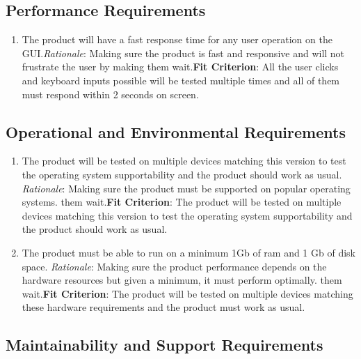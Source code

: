\documentclass[12pt, titlepage]{article}
\begin{document}
\subsection{Performance Requirements}
\begin{enumerate}[{NFR}3.]
	\item The product will have a fast response time for any user operation on the GUI.\newline \emph{Rationale}:  Making sure the product is fast and responsive and will not frustrate the user by making them wait.\newline \textbf{Fit Criterion}: All the user clicks and keyboard inputs possible will be tested multiple times and all of them must respond within 2 seconds on screen. 
\end{enumerate}

\subsection{Operational and Environmental Requirements}

\begin{enumerate}[{NFR4}.1]
	\item The product will be tested on multiple devices matching this version to test the operating system supportability and the product should work as usual.
	\newline \emph{Rationale}:  Making sure the product must be supported on popular operating systems.
	 them wait.\newline \textbf{Fit Criterion}: The product will be tested on multiple devices matching this version to test the operating system supportability and the product should work as usual.
	 
	 \item The product must be able to run on a minimum 1Gb of ram and 1 Gb of disk space. 	 
	 \newline \emph{Rationale}:  Making sure the product performance depends on the hardware resources but given a minimum, it must perform optimally.
	 them wait.\newline \textbf{Fit Criterion}: The product will be tested on multiple devices matching these hardware requirements and the product must work as usual.	
\end{enumerate}

\subsection{Maintainability and Support Requirements}
\end{document}
